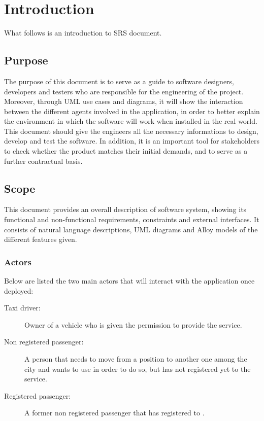 \section{Introduction}      %
What follows is an introduction to \myTaxiService{} SRS document.
\subsection{Purpose}
The purpose of this document is to serve as a guide to software designers, developers and testers who are responsible for the engineering of the \myTaxiService{} project.
Moreover, through UML use cases and diagrams, it will show the interaction between the different agents involved in the application, in order to better explain the environment in which the software will work when installed in the real world.
This document should give the engineers all the necessary informations to design, develop and test the software.
In addition, it is an important tool for stakeholders to check whether the product matches their initial demands, and to serve as a further contractual basis.
\subsection{Scope}
This document provides an overall description of \myTaxiService{} software system, showing its functional and non-functional requirements, constraints and external interfaces.
It consists of natural language descriptions, UML diagrams and Alloy models of the different features given.
\subsubsection{Actors}
Below are listed the two main actors that will interact with the application once deployed:
\begin{description} %
	\item[Taxi driver:]	Owner of a vehicle who is given the permission to provide the service.
	\item[Non registered passenger:] A person that needs to move from a position to another one among the city and wants to use \myTaxiService{} in order to do so, but has not registered yet to the service.
	\item[Registered passenger:] A former non registered passenger that has registered to \myTaxiService{}.
\end{description}
